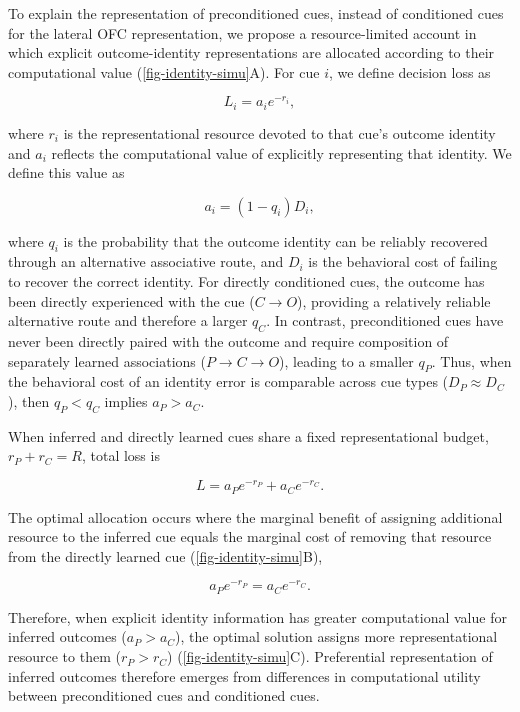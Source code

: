 \documentclass[12pt,letterpaper]{article}
\begin{document}
To explain the representation of preconditioned cues, instead of conditioned cues for the lateral OFC representation, we propose a resource-limited account in which explicit outcome-identity representations are allocated according to their computational value (\autoref{fig-identity-simu}A). For cue $i$, we define decision loss as


\begin{equation}
L_i = a_i e^{-r_i},
\end{equation}

where $r_i$ is the representational resource devoted to that cue's outcome identity and $a_i$ reflects the computational value of explicitly representing that identity. We define this value as

\begin{equation}
a_i = (1-q_i) D_i,
\end{equation}

where $q_i$ is the probability that the outcome identity can be reliably recovered through an alternative associative route, and $D_i$ is the behavioral cost of failing to recover the correct identity. For directly conditioned cues, the outcome has been directly experienced with the cue ($C \rightarrow O$), providing a relatively reliable alternative route and therefore a larger $q_C$. In contrast, preconditioned cues have never been directly paired with the outcome and require composition of separately learned associations ($P \rightarrow C \rightarrow O$), leading to a smaller $q_P$. Thus, when the behavioral cost of an identity error is comparable across cue types ($D_P \approx D_C$), then $q_P < q_C$ implies $a_P > a_C$.

When inferred and directly learned cues share a fixed representational budget,
$r_P + r_C = R$, total loss is

\begin{equation}
L = a_P e^{-r_P} + a_C e^{-r_C}.
\end{equation}

The optimal allocation occurs where the marginal benefit of assigning additional resource to the inferred cue equals the marginal cost of removing that resource from the directly learned cue (\autoref{fig-identity-simu}B),

\begin{equation}
a_P e^{-r_P} = a_C e^{-r_C}.
\end{equation}

Therefore, when explicit identity information has greater computational value for inferred outcomes ($a_P > a_C$), the optimal solution assigns more representational resource to them ($r_P > r_C$) (\autoref{fig-identity-simu}C). Preferential representation of inferred outcomes therefore emerges from differences in computational utility between preconditioned cues and conditioned cues.
\end{document}
